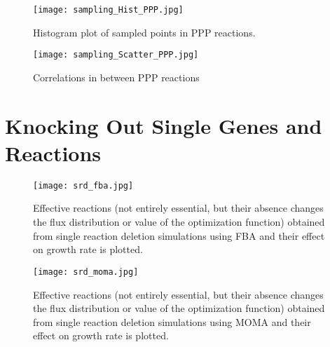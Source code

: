 \begin{landscape}
   \begin{figure}[H]
    \begin{center}
      \begin{sidewaysfigure}
       \texttt{[image: sampling\_Hist\_PPP.jpg]}
      \end{sidewaysfigure}
    \end{center}
   \caption[Histogram plots of available flux values for PPP reactions]{Histogram plot of sampled points in PPP reactions.}
   \label{fig:sampling_Hist_PPP}
   \end{figure}

   \begin{figure}[H]
    \begin{center}
      \begin{sidewaysfigure}
       \texttt{[image: sampling\_Scatter\_PPP.jpg]}
      \end{sidewaysfigure}
    \end{center}
   \caption[Correlations in between PPP reactions]{Correlations in between PPP reactions}
   \label{fig:sampling_Scatter_PPP}
   \end{figure}
\end{landscape}


\section{Knocking Out Single Genes and Reactions}

\begin{figure}[H]
\begin{center}
\texttt{[image: srd\_fba.jpg]}
\end{center}
\caption[Effective reactions found from the deletion analysis using FBA]{Effective reactions (not entirely essential, but  their absence changes the flux distribution or value of the optimization function) obtained from single reaction deletion simulations using FBA and their effect on growth rate is plotted.}
\label{fig:srd_fba}
\end{figure}

\begin{figure}[H]
\begin{center}
\texttt{[image: srd\_moma.jpg]}
\end{center}
\caption[Effective reactions found from the deletion analysis using MOMA]{Effective reactions (not entirely essential, but  their absence changes the flux distribution or value of the optimization function) obtained from single reaction deletion simulations using MOMA and their effect on growth rate is plotted.}
\label{fig:srd_moma}
\end{figure}


